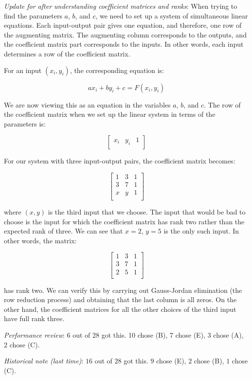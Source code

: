 \documentclass[10pt]{amsart}
\begin{document}
\begin{enumerate}
  {\em Update for after understanding coefficient matrices and ranks}:
  When trying to find the parameters $a$, $b$, and $c$, we need to set
  up a system of simultaneous linear equations. Each input-output pair
  gives one equation, and therefore, one row of the augmenting
  matrix. The augmenting column corresponds to the outputs, and the
  coefficient matrix part corresponds to the inputs. In other words,
  each input determines a row of the coefficient matrix.

  For an input $(x_i,y_i)$, the corresponding equation is:

  $$ax_i + by_i + c = F(x_i,y_i)$$

  We are now viewing this as an equation in the variables $a$, $b$,
  and $c$. The row of the coefficient matrix when we set up the linear
  system in terms of the parameters is:

  $$\left[\begin{matrix} x_i & y_i & 1 \\\end{matrix}\right]$$

  For our system with three input-output pairs, the coefficient matrix
  becomes:

  $$\left[\begin{matrix} 1 & 3 & 1 \\ 3 & 7 & 1 \\ x & y & 1 \\\end{matrix} \right]$$
  
  where $(x,y)$ is the third input that we choose. The input that
  would be bad to choose is the input for which the coefficient matrix
  has rank two rather than the expected rank of three. We can see that
  $x = 2$, $y = 5$ is the only such input. In other words, the matrix:

  $$\left[\begin{matrix} 1 & 3 & 1 \\ 3 & 7 & 1 \\ 2 & 5 & 1 \\\end{matrix} \right]$$

  has rank two. We can verify this by carrying out Gauss-Jordan
  elimination (the row reduction process) and obtaining that the last
  column is all zeros. On the other hand, the coefficient matrices for
  all the other choices of the third input have full rank three.

  {\em Performance review}: 6 out of
  28 got this. 10 chose (B), 7 chose (E), 3 chose (A), 2 chose (C).

  {\em Historical note (last time)}: $16$ out of $28$ got this. $9$ chose (E),
  $2$ chose (B), $1$ chose (C).
\end{enumerate}
\end{document}
